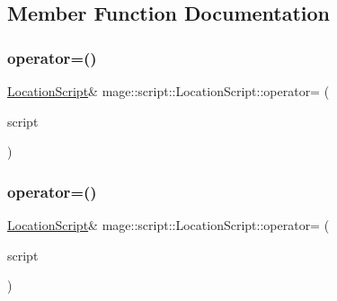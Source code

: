 \subsection{Member Function Documentation}
\hypertarget{classmage_1_1script_1_1_location_script_a089b534e23f8c60586b9700c33f9bc9f}{}\label{classmage_1_1script_1_1_location_script_a089b534e23f8c60586b9700c33f9bc9f} 
\subsubsection{\texorpdfstring{operator=()}{operator=()}\hspace{0.1cm}{\footnotesize\ttfamily [1/2]}}
{\footnotesize\ttfamily \hyperlink{classmage_1_1script_1_1_location_script}{Location\+Script}\& mage\+::script\+::\+Location\+Script\+::operator= (\begin{DoxyParamCaption}\item[{const \hyperlink{classmage_1_1script_1_1_location_script}{Location\+Script} \&}]{script }\end{DoxyParamCaption})\hspace{0.3cm}{\ttfamily [delete]}}

\hypertarget{classmage_1_1script_1_1_location_script_a51f836eb7c96e433d28708bab47c4b48}{}\label{classmage_1_1script_1_1_location_script_a51f836eb7c96e433d28708bab47c4b48} 
\subsubsection{\texorpdfstring{operator=()}{operator=()}\hspace{0.1cm}{\footnotesize\ttfamily [2/2]}}
{\footnotesize\ttfamily \hyperlink{classmage_1_1script_1_1_location_script}{Location\+Script}\& mage\+::script\+::\+Location\+Script\+::operator= (\begin{DoxyParamCaption}\item[{\hyperlink{classmage_1_1script_1_1_location_script}{Location\+Script} \&\&}]{script }\end{DoxyParamCaption})\hspace{0.3cm}{\ttfamily [delete]}}

